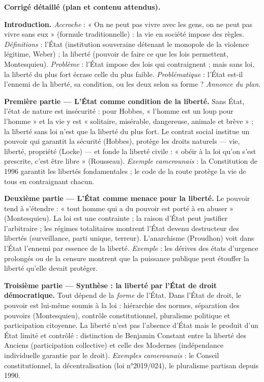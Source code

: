 \documentclass[11pt]{article}
\begin{document}
\begin{corrige}
\textbf{Corrigé détaillé (plan et contenu attendus).}

\textbf{Introduction.} \emph{Accroche} : « On ne peut pas vivre avec les gens, on ne peut pas vivre sans eux » (formule traditionnelle) : la vie en société impose des règles. \emph{Définitions} : l'État (institution souveraine détenant le monopole de la violence légitime, Weber) ; la liberté (pouvoir de faire ce que les lois permettent, Montesquieu). \emph{Problème} : l'État impose des lois qui contraignent ; mais sans loi, la liberté du plus fort écrase celle du plus faible. \emph{Problématique} : l'État est-il l'ennemi de la liberté, sa condition, ou les deux selon sa forme ? \emph{Annonce du plan}.

\textbf{Première partie — L'État comme condition de la liberté.} Sans État, l'état de nature est insécurité : pour Hobbes, « l'homme est un loup pour l'homme » et la vie y est « solitaire, misérable, dangereuse, animale et brève » ; la liberté sans loi n'est que la liberté du plus fort. Le contrat social institue un pouvoir qui garantit la sécurité (Hobbes), protège les droits naturels — vie, liberté, propriété (Locke) — et fonde la liberté civile : « obéir à la loi qu'on s'est prescrite, c'est être libre » (Rousseau). \emph{Exemple camerounais} : la Constitution de 1996 garantit les libertés fondamentales ; le code de la route protège la vie de tous en contraignant chacun.

\textbf{Deuxième partie — L'État comme menace pour la liberté.} Le pouvoir tend à s'étendre : « tout homme qui a du pouvoir est porté à en abuser » (Montesquieu). La loi est une contrainte ; la raison d'État peut justifier l'arbitraire ; les régimes totalitaires montrent l'État devenu destructeur des libertés (surveillance, parti unique, terreur). L'anarchisme (Proudhon) voit dans l'État l'ennemi par essence de la liberté. \emph{Exemple} : les dérives des états d'urgence prolongés ou de la censure montrent que la puissance publique peut étouffer la liberté qu'elle devait protéger.

\textbf{Troisième partie — Synthèse : la liberté par l'État de droit démocratique.} Tout dépend de la \emph{forme} de l'État. Dans l'État de droit, le pouvoir est lui-même soumis à la loi : hiérarchie des normes, séparation des pouvoirs (Montesquieu), contrôle constitutionnel, pluralisme politique et participation citoyenne. La liberté n'est pas l'absence d'État mais le produit d'un État limité et contrôlé : distinction de Benjamin Constant entre la liberté des Anciens (participation collective) et celle des Modernes (indépendance individuelle garantie par le droit). \emph{Exemples camerounais} : le Conseil constitutionnel, la décentralisation (loi n°2019/024), le pluralisme partisan depuis 1990.


\end{corrige}
\end{document}
